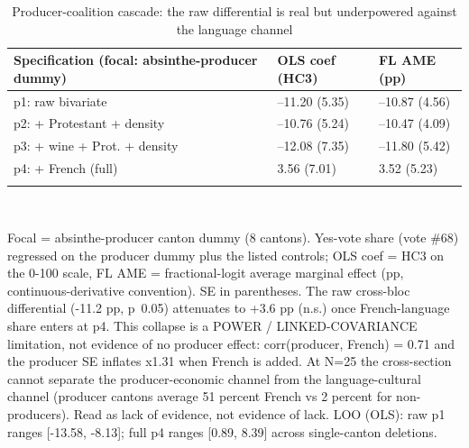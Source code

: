 \begin{table}[tbp] \centering
{}

\caption{Producer-coalition cascade: the raw differential is real but underpowered against the language channel}
\label{tab:T_producer_cascade}
\begin{tabularx}{\linewidth}{@{}lCC@{}}

\toprule
{Specification (focal: absinthe-producer dummy)}&{OLS coef (HC3)}&{FL AME (pp)} \tabularnewline
\midrule \addlinespace[\belowrulesep]
p1: raw bivariate&--11.20 (5.35)&--10.87 (4.56) \tabularnewline
p2: + Protestant + density&--10.76 (5.24)&--10.47 (4.09) \tabularnewline
p3: + wine + Prot. + density&--12.08 (7.35)&--11.80 (5.42) \tabularnewline
p4: + French (full)&3.56 (7.01)&3.52 (5.23) \tabularnewline
\bottomrule \addlinespace[\belowrulesep]

\end{tabularx}
\\ \parbox{\linewidth}{\footnotesize Focal = absinthe-producer canton dummy (8 cantons). Yes-vote share (vote \#68) regressed on the producer dummy plus the listed controls; OLS coef = HC3 on the 0-100 scale, FL AME = fractional-logit average marginal effect (pp, continuous-derivative convention). SE in parentheses. The raw cross-bloc differential (-11.2 pp, p~0.05) attenuates to +3.6 pp (n.s.) once French-language share enters at p4. This collapse is a POWER / LINKED-COVARIANCE limitation, not evidence of no producer effect: corr(producer, French) = 0.71 and the producer SE inflates x1.31 when French is added. At N=25 the cross-section cannot separate the producer-economic channel from the language-cultural channel (producer cantons average 51 percent French vs 2 percent for non-producers). Read as lack of evidence, not evidence of lack. LOO (OLS): raw p1 ranges [-13.58, -8.13]; full p4 ranges [0.89, 8.39] across single-canton deletions.}
\end{table}
